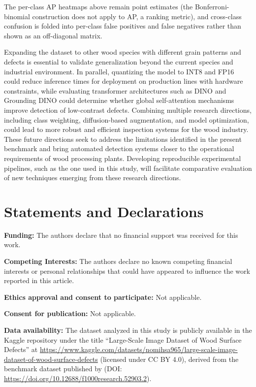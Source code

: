 \documentclass[pdflatex,sn-basic,Numbered,iicol]{sn-jnl}
\begin{document}
The per-class AP heatmaps above remain point estimates (the Bonferroni-binomial construction does not apply to AP, a ranking metric), and cross-class confusion is folded into per-class false positives and false negatives rather than shown as an off-diagonal matrix.

Expanding the dataset to other wood species with different grain patterns and defects is essential to validate generalization beyond the current species and industrial environment. In parallel, quantizing the model to INT8 and FP16 could reduce inference times for deployment on production lines with hardware constraints, while evaluating transformer architectures such as DINO and Grounding DINO could determine whether global self-attention mechanisms improve detection of low-contrast defects. Combining multiple research directions, including class weighting, diffusion-based augmentation, and model optimization, could lead to more robust and efficient inspection systems for the wood industry. These future directions seek to address the limitations identified in the present benchmark and bring automated detection systems closer to the operational requirements of wood processing plants. Developing reproducible experimental pipelines, such as the one used in this study, will facilitate comparative evaluation of new techniques emerging from these research directions.

\FloatBarrier

\backmatter

\section*{Statements and Declarations}

\noindent\textbf{Funding:} The authors declare that no financial support was received for this work.

\noindent\textbf{Competing Interests:} The authors declare no known competing financial interests or personal relationships that could have appeared to influence the work reported in this article.

\noindent\textbf{Ethics approval and consent to participate:} Not applicable.

\noindent\textbf{Consent for publication:} Not applicable.

\noindent\textbf{Data availability:} The dataset analyzed in this study is publicly available in the Kaggle repository under the title ``Large-Scale Image Dataset of Wood Surface Defects'' at \url{https://www.kaggle.com/datasets/nomihsa965/large-scale-image-dataset-of-wood-surface-defects} (licensed under CC BY 4.0), derived from the benchmark dataset published by \citet{Kodytek2022Dataset} (DOI: \url{https://doi.org/10.12688/f1000research.52903.2}).
\end{document}

